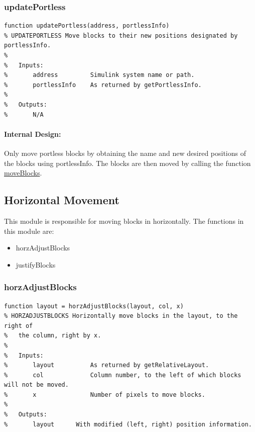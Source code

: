 \documentclass[12pt,letterpaper]{report}
\begin{document}
\subsubsection{updatePortless} \label{updatePortless}
\begin{lstlisting}
function updatePortless(address, portlessInfo)
% UPDATEPORTLESS Move blocks to their new positions designated by portlessInfo.
%
%   Inputs:
%       address         Simulink system name or path.
%       portlessInfo    As returned by getPortlessInfo.
%
%   Outputs:
%       N/A
\end{lstlisting}
\paragraph{Internal Design:} Only move portless blocks by obtaining the name and new desired positions of the blocks using portlessInfo. The blocks are then moved by calling the function \hyperref[moveBlocks]{moveBlocks}.


\subsection{Horizontal Movement} \label{Horizontal_Movement}
\par This module is responsible for moving blocks in horizontally. The functions in this module are:
\begin{itemize}
	\item horzAdjustBlocks
	\item justifyBlocks
\end{itemize}

\subsubsection{horzAdjustBlocks}  \label{horzAdjustBlocks}
\begin{lstlisting}
function layout = horzAdjustBlocks(layout, col, x)
% HORZADJUSTBLOCKS Horizontally move blocks in the layout, to the right of
%   the column, right by x.
%
%   Inputs:
%       layout          As returned by getRelativeLayout.
%       col             Column number, to the left of which blocks will not be moved.
%       x               Number of pixels to move blocks.
%
%   Outputs:
%       layout      With modified (left, right) position information.
\end{lstlisting}
\end{document}
